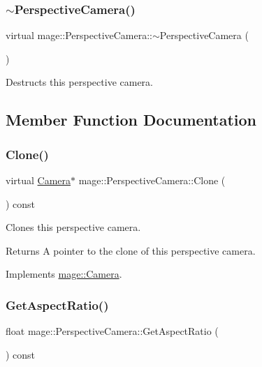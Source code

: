 \subsubsection{\texorpdfstring{$\sim$\+Perspective\+Camera()}{~PerspectiveCamera()}}
{\footnotesize\ttfamily virtual mage\+::\+Perspective\+Camera\+::$\sim$\+Perspective\+Camera (\begin{DoxyParamCaption}{ }\end{DoxyParamCaption})\hspace{0.3cm}{\ttfamily [virtual]}}

Destructs this perspective camera. 

\subsection{Member Function Documentation}
\hypertarget{classmage_1_1_perspective_camera_aa2fae7b2ca5daadeda0fd935fcdb101a}{}\label{classmage_1_1_perspective_camera_aa2fae7b2ca5daadeda0fd935fcdb101a} 
\subsubsection{\texorpdfstring{Clone()}{Clone()}}
{\footnotesize\ttfamily virtual \hyperlink{classmage_1_1_camera}{Camera}$\ast$ mage\+::\+Perspective\+Camera\+::\+Clone (\begin{DoxyParamCaption}{ }\end{DoxyParamCaption}) const\hspace{0.3cm}{\ttfamily [virtual]}}

Clones this perspective camera.

\begin{DoxyReturn}{Returns}
A pointer to the clone of this perspective camera. 
\end{DoxyReturn}


Implements \hyperlink{classmage_1_1_camera_a19301c2256c183db50b5e9406f7b5f3c}{mage\+::\+Camera}.

\hypertarget{classmage_1_1_perspective_camera_ab74cbd2777d5b430da5702a12b1b451e}{}\label{classmage_1_1_perspective_camera_ab74cbd2777d5b430da5702a12b1b451e} 
\subsubsection{\texorpdfstring{Get\+Aspect\+Ratio()}{GetAspectRatio()}}
{\footnotesize\ttfamily float mage\+::\+Perspective\+Camera\+::\+Get\+Aspect\+Ratio (\begin{DoxyParamCaption}{ }\end{DoxyParamCaption}) const}

